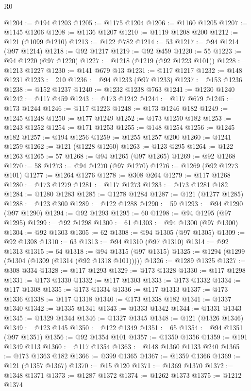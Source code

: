 \begin{lexlean}{R0}
\begin{coremodule}
@1204 := @194 @1203
@1205 := @1175 @1204
@1206 := @1160 @1205
@1207 := @1145 @1206
@1208 := @1136 @1207
@1210 := @1119 @1208 @200
@1212 := @121 (@1099 @1210)
@1213 := @122 @782
@1214 := 53
@1217 := @94 @1214 (@97 @1214)
@1218 := @92 @1217
@1219 := @92 @459
@1220 := 55
@1223 := @94 @1220 (@97 @1220)
@1227 := @1218 (@1219 (@92 @1223 @101))
@1228 := @1213 @1227
@1230 := @141 @679 @13
@1231 := @117 @1217
@1232 := @148 @1231
@1233 := 210
@1236 := @94 @1233 (@97 @1233)
@1237 := @153 @1236
@1238 := @152 @1237
@1240 := @1232 @1238 @763
@1241 := @1230 @1240
@1242 := @117 @459
@1243 := @173 @1242
@1244 := @117 @679
@1245 := @173 @1244
@1246 := @117 @1223
@1248 := @173 @1246 @182
@1249 := @1245 @1248
@1250 := @177 @1249
@1252 := @173 @1250 @182
@1253 := @1243 @1252
@1254 := @171 @1253
@1255 := @148 @1254
@1256 := @1245 @182
@1257 := @194 @1256
@1259 := @1255 @1257 @200
@1260 := @1241 @1259
@1262 := @121 (@1228 @1260)
@1263 := @123 @295
@1264 := @122 @1263
@1265 := 57
@1268 := @94 @1265 (@97 @1265)
@1269 := @92 @1268
@1270 := 58
@1273 := @94 @1270 (@97 @1270)
@1276 := @1269 (@92 @1273 @101)
@1277 := @1264 @1276
@1278 := @308 @264
@1279 := @117 @1268
@1280 := @173 @1279
@1281 := @117 @1273
@1283 := @173 @1281 @182
@1284 := @1280 @1283
@1285 := @1278 @1284
@1287 := @121 (@1277 @1285)
@1288 := @123 @300
@1289 := @122 @1288
@1290 := 59
@1293 := @94 @1290 (@97 @1290)
@1294 := @92 @1293
@1295 := 60
@1298 := @94 @1295 (@97 @1295)
@1299 := @92 @1298
@1300 := 61
@1303 := @94 @1300 (@97 @1300)
@1304 := @92 @1303
@1305 := 62
@1308 := @94 @1305 (@97 @1305)
@1309 := @92 @1308
@1310 := 63
@1313 := @94 @1310 (@97 @1310)
@1314 := @92 @1313
@1315 := 64
@1318 := @94 @1315 (@97 @1315)
@1325 := @1294 (@1299 (@1304 (@1309 (@1314 (@92 @1318 @101)))))
@1326 := @1289 @1325
@1327 := @308 @334
@1328 := @117 @1293
@1329 := @173 @1328
@1330 := @117 @1298
@1331 := @173 @1330
@1332 := @117 @1303
@1333 := @173 @1332
@1334 := @117 @1308
@1335 := @173 @1334
@1336 := @117 @1313
@1337 := @173 @1336
@1338 := @117 @1318
@1340 := @173 @1338 @182
@1341 := @1337 @1340
@1342 := @1335 @1341
@1343 := @1333 @1342
@1344 := @1331 @1343
@1345 := @1329 @1344
@1346 := @1327 @1345
@1348 := @121 (@1326 @1346)
@1349 := @123 @145
@1350 := @122 @1349
@1351 := 65
@1354 := @94 @1351 (@97 @1351)
@1356 := @92 @1354 @101
@1357 := @1350 @1356
@1359 := @191 @1349 @113
@1360 := @117 @1354
@1363 := @148 @1360 @1133 @240
@1365 := @173 @1363 @182
@1366 := @399 @1365
@1367 := @1359 @1366
@1369 := @121 (@1357 @1367)
@1370 := @15 @120
@1371 := @1369 @1370
@1372 := @1348 @1371
@1373 := @1287 @1372
@1374 := @1262 @1373
@1375 := @1212 @1374

\end{coremodule}
\end{lexlean}
